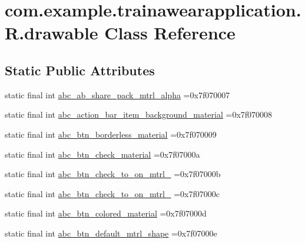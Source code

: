 \hypertarget{classcom_1_1example_1_1trainawearapplication_1_1_r_1_1drawable}{}\section{com.\+example.\+trainawearapplication.\+R.\+drawable Class Reference}
\label{classcom_1_1example_1_1trainawearapplication_1_1_r_1_1drawable}
\subsection*{Static Public Attributes}
\begin{DoxyCompactItemize}
\item 
static final int \mbox{\hyperlink{classcom_1_1example_1_1trainawearapplication_1_1_r_1_1drawable_ae9c5343499cb9eb7128155ca14ae7495}{abc\+\_\+ab\+\_\+share\+\_\+pack\+\_\+mtrl\+\_\+alpha}} =0x7f070007
\item 
static final int \mbox{\hyperlink{classcom_1_1example_1_1trainawearapplication_1_1_r_1_1drawable_a1f2b769ab85381d90be8d16981f12846}{abc\+\_\+action\+\_\+bar\+\_\+item\+\_\+background\+\_\+material}} =0x7f070008
\item 
static final int \mbox{\hyperlink{classcom_1_1example_1_1trainawearapplication_1_1_r_1_1drawable_acc95b69ede0b445dd6d757f55f0ff222}{abc\+\_\+btn\+\_\+borderless\+\_\+material}} =0x7f070009
\item 
static final int \mbox{\hyperlink{classcom_1_1example_1_1trainawearapplication_1_1_r_1_1drawable_a6ac983a62be5f9b6829207c6e2b398c0}{abc\+\_\+btn\+\_\+check\+\_\+material}} =0x7f07000a
\item 
static final int \mbox{\hyperlink{classcom_1_1example_1_1trainawearapplication_1_1_r_1_1drawable_ae4c04acd7f37c24e82e03e744dfb4ecf}{abc\+\_\+btn\+\_\+check\+\_\+to\+\_\+on\+\_\+mtrl\+\_}} =0x7f07000b
\item 
static final int \mbox{\hyperlink{classcom_1_1example_1_1trainawearapplication_1_1_r_1_1drawable_a02a791e3e719e0908557c71e1d7279ef}{abc\+\_\+btn\+\_\+check\+\_\+to\+\_\+on\+\_\+mtrl\+\_}} =0x7f07000c
\item 
static final int \mbox{\hyperlink{classcom_1_1example_1_1trainawearapplication_1_1_r_1_1drawable_a749dc45fa7e1e383bbf0571a5f55dc87}{abc\+\_\+btn\+\_\+colored\+\_\+material}} =0x7f07000d
\item 
static final int \mbox{\hyperlink{classcom_1_1example_1_1trainawearapplication_1_1_r_1_1drawable_a95d96f9d97f67ea8ee2036b173897444}{abc\+\_\+btn\+\_\+default\+\_\+mtrl\+\_\+shape}} =0x7f07000e

\end{DoxyCompactItemize}
